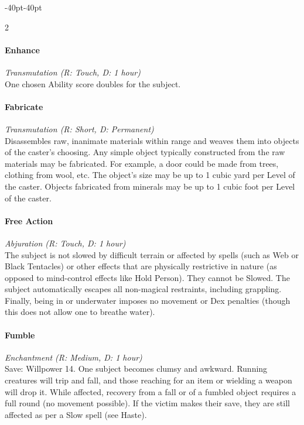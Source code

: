 \documentclass{book}
\begin{document}
\begin{adjustwidth}{-40pt}{-40pt}
\begin{multicols}{2}
\paragraph{Enhance}\label{enhance}

\emph{Transmutation (R: Touch, D: 1 hour)}\\
One chosen Ability score doubles for the subject.

\paragraph{Fabricate}\label{fabricate}

\emph{Transmutation (R: Short, D: Permanent)}\\
Disassembles raw, inanimate materials within range and weaves them into
objects of the caster's choosing. Any simple object typically
constructed from the raw materials may be fabricated. For example, a
door could be made from trees, clothing from wool, etc. The object's
size may be up to 1 cubic yard per Level of the caster. Objects
fabricated from minerals may be up to 1 cubic foot per Level of the
caster.

\paragraph{Free Action}\label{free-action}

\emph{Abjuration (R: Touch, D: 1 hour)}\\
The subject is not slowed by difficult terrain or affected by spells
(such as Web or Black Tentacles) or other effects that are physically
restrictive in nature (as opposed to mind-control effects like Hold
Person). They cannot be Slowed. The subject automatically escapes all
non-magical restraints, including grappling. Finally, being in or
underwater imposes no movement or Dex penalties (though this does not
allow one to breathe water).

\paragraph{Fumble}\label{fumble}

\emph{Enchantment (R: Medium, D: 1 hour)}\\
Save: Willpower 14. One subject becomes clumsy and awkward. Running
creatures will trip and fall, and those reaching for an item or wielding
a weapon will drop it. While affected, recovery from a fall or of a
fumbled object requires a full round (no movement possible). If the
victim makes their save, they are still affected as per a Slow spell
(see Haste).


\end{multicols}
\end{adjustwidth}
\end{document}
